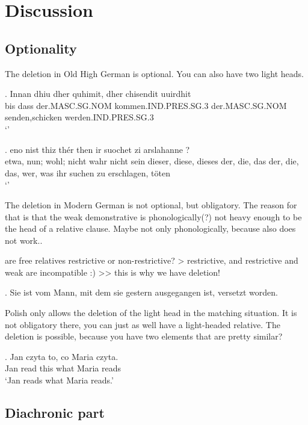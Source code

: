 
\chapter{Discussion}\label{ch:discussion}

\section{Optionality}

The deletion in Old High German is optional. You can also have two light heads.

\exg. Innan dhiu dher quhimit, dher chisendit uuirdhit\\
bis dass der.MASC.SG.NOM kommen.IND.PRES.SG.3  der.MASC.SG.NOM senden,schicken werden.IND.PRES.SG.3\\
`' 

\exg. eno	nist	thiz	thér	then	ir	suochet	zi	arslahanne	?\\
 etwa, nun; wohl; nicht wahr	nicht	sein	dieser, diese, dieses	der, die, das	der, die, das, wer, was	ihr	suchen	zu	erschlagen, töten\\
 `'

The deletion in Modern German is not optional, but obligatory. The reason for that is that the weak demonstrative is phonologically(?) not heavy enough to be the head of a relative clause. Maybe not only phonologically, because  also does not work..

are free relatives restrictive or non-restrictive? > restrictive, and restrictive and weak are incompatible :)  >> this is why we have deletion!

\ex. Sie ist vom Mann, mit dem sie gestern ausgegangen ist, versetzt worden.


Polish only allows the deletion of the light head in the matching situation. It is not obligatory there, you can just as well have a light-headed relative. The deletion is possible, because you have two elements that are pretty similar?

\exg. Jan czyta to, co Maria czyta.\\
 Jan read this what Maria reads\\
 `Jan reads what Maria reads.' 


\section{Diachronic part}

